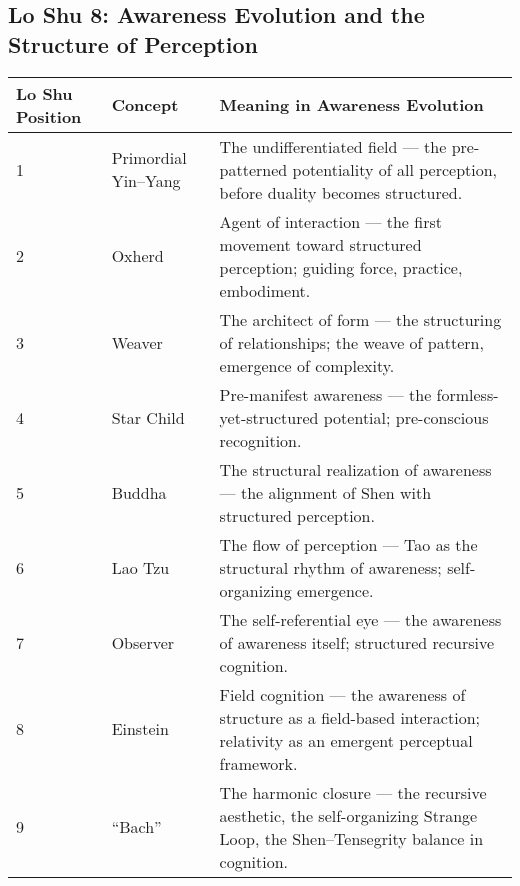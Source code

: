\documentclass{article}
\begin{document}
\begin{landscape}

\section*{Lo Shu 8: Awareness Evolution and the Structure of Perception}

\renewcommand{\arraystretch}{1.4}

\begin{tabular}{|p{1.8cm}|p{3.2cm}|p{10.8cm}|}
\hline
\textbf{Lo Shu Position} & 
\textbf{Concept} & 
\textbf{Meaning in Awareness Evolution} \\
\hline

1 & 
Primordial Yin–Yang & 
The undifferentiated field — the pre-patterned potentiality of all perception, before duality becomes structured. \\
\hline

2 & 
Oxherd & 
Agent of interaction — the first movement toward structured perception; guiding force, practice, embodiment. \\
\hline

3 & 
Weaver & 
The architect of form — the structuring of relationships; the weave of pattern, emergence of complexity. \\
\hline

4 & 
Star Child & 
Pre-manifest awareness — the formless-yet-structured potential; pre-conscious recognition. \\
\hline

5 & 
Buddha & 
The structural realization of awareness — the alignment of Shen with structured perception. \\
\hline

6 & 
Lao Tzu & 
The flow of perception — Tao as the structural rhythm of awareness; self-organizing emergence. \\
\hline

7 & 
Observer & 
The self-referential eye — the awareness of awareness itself; structured recursive cognition. \\
\hline

8 & 
Einstein & 
Field cognition — the awareness of structure as a field-based interaction; relativity as an emergent perceptual framework. \\
\hline

9 & 
“Bach” & 
The harmonic closure — the recursive aesthetic, the self-organizing Strange Loop, the Shen–Tensegrity balance in cognition. \\
\hline

\end{tabular}

\end{landscape}
\end{document}
